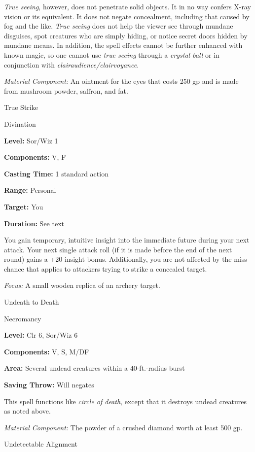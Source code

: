 \documentclass{article}
\begin{document}
\textit{True seeing}, however, does not penetrate solid objects. It in no way confers 
X-ray vision or its equivalent. It does not negate concealment, including that 
caused by fog and the like. \textit{True seeing }does not help the viewer see through 
mundane disguises, spot creatures who are simply hiding, or notice secret doors 
hidden by mundane means. In addition, the spell effects cannot be further enhanced 
with known magic, so one cannot use \textit{true seeing }through a \textit{crystal 
ball }or in conjunction with \textit{clairaudience/clairvoyance}.

\textit{Material Component: }An ointment for the eyes that costs 250 gp and is 
made from mushroom powder, saffron, and fat.

\vspace{12pt}
True Strike

Divination

\textbf{Level:} Sor/Wiz 1

\textbf{Components:} V, F

\textbf{Casting Time:} 1 standard action

\textbf{Range:} Personal

\textbf{Target:} You

\textbf{Duration:} See text

You gain temporary, intuitive insight into the immediate future during your next 
attack. Your next single attack roll (if it is made before the end of the next 
round) gains a +20 insight bonus. Additionally, you are not affected by the miss 
chance that applies to attackers trying to strike a concealed target.

\textit{Focus: }A small wooden replica of an archery target.

\vspace{12pt}
Undeath to Death

Necromancy

\textbf{Level:} Clr 6, Sor/Wiz 6

\textbf{Components:} V, S, M/DF

\textbf{Area:} Several undead creatures within a 40-ft.-radius burst

\textbf{Saving Throw: }Will negates

This spell functions like \textit{circle of death}, except that it destroys undead 
creatures as noted above.

\textit{Material Component: }The powder of a crushed diamond worth at least 500 
gp.

\vspace{12pt}
Undetectable Alignment
\end{document}
